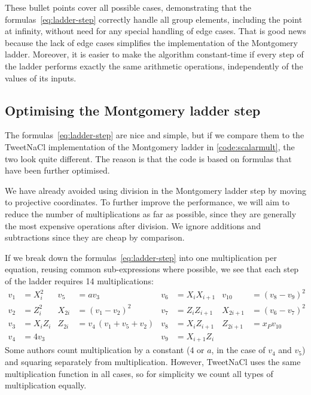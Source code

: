 \documentclass{article}
\begin{document}
These bullet points cover all possible cases, demonstrating that the formulas~\eqref{eq:ladder-step} correctly handle all group elements, including the point at infinity, without need for any special handling of edge cases.
That is good news because the lack of edge cases simplifies the implementation of the Montgomery ladder.
Moreover, it is easier to make the algorithm constant-time if every step of the ladder performs exactly the same arithmetic operations, independently of the values of its inputs.

\subsection{Optimising the Montgomery ladder step}

The formulas~\eqref{eq:ladder-step} are nice and simple, but if we compare them to the TweetNaCl implementation of the Montgomery ladder in \autoref{code:scalarmult}, the two look quite different.
The reason is that the code is based on formulas that have been further optimised.

We have already avoided using division in the Montgomery ladder step by moving to projective coordinates.
To further improve the performance, we will aim to reduce the number of multiplications as far as possible, since they are generally the most expensive operations after division.
We ignore additions and subtractions since they are cheap by comparison.

If we break down the formulas~\eqref{eq:ladder-step} into one multiplication per equation, reusing common sub-expressions where possible, we see that each step of the ladder requires 14 multiplications:
\begin{align*}
    v_1 &= X_i^2 &
    v_5 &= a v_3 &
    v_6 &= X_i X_{i+1} &
    v_{10} &= (v_8 - v_9)^2 \\
    v_2 &= Z_i^2 &
    X_{2i} &= (v_1 - v_2)^2 &
    v_7 &= Z_i Z_{i+1} &
    X_{2i+1} &= (v_6 - v_7)^2 \\
    v_3 &= X_i Z_i &
    Z_{2i} &= v_4\,(v_1 + v_5 + v_2) &
    v_8 &= X_i Z_{i+1} &
    Z_{2i+1} &= x_P v_{10} \\
    v_4 &= 4 v_3 &&&
    v_9 &= X_{i+1} Z_i
\end{align*}
Some authors count multiplication by a constant ($4$ or $a$, in the case of $v_4$ and $v_5$) and squaring separately from multiplication.
However, TweetNaCl uses the same multiplication function in all cases, so for simplicity we count all types of multiplication equally.
\end{document}
